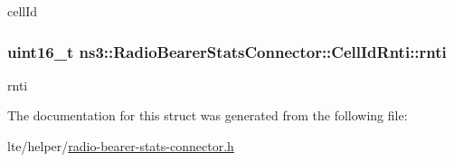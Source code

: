 cell\+Id 

\subsubsection[{\texorpdfstring{rnti}{rnti}}]{\setlength{\rightskip}{0pt plus 5cm}uint16\+\_\+t ns3\+::\+Radio\+Bearer\+Stats\+Connector\+::\+Cell\+Id\+Rnti\+::rnti}\hypertarget{structns3_1_1RadioBearerStatsConnector_1_1CellIdRnti_a9103323d3fcfff3233c0ca3c359e763b}{}\label{structns3_1_1RadioBearerStatsConnector_1_1CellIdRnti_a9103323d3fcfff3233c0ca3c359e763b}


rnti 



The documentation for this struct was generated from the following file\+:\begin{DoxyCompactItemize}
\item 
lte/helper/\hyperlink{radio-bearer-stats-connector_8h}{radio-\/bearer-\/stats-\/connector.\+h}\end{DoxyCompactItemize}
